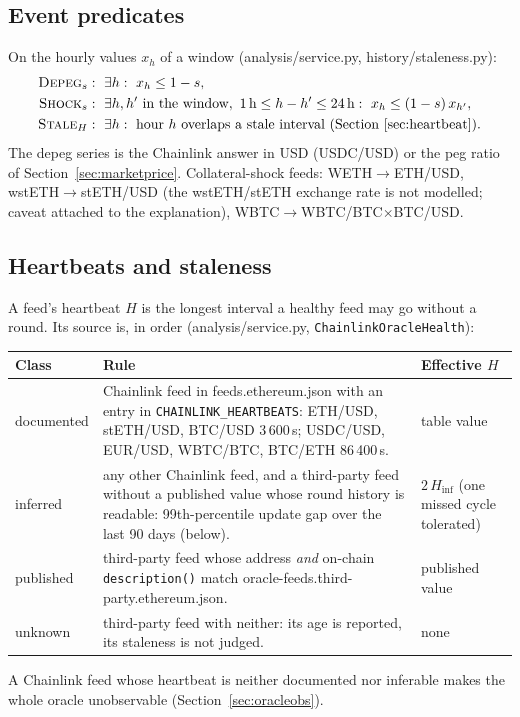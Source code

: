 \documentclass[11pt,a4paper]{article}
\newcommand{\code}[1]{\texttt{#1}}
\newcommand{\src}[1]{\textsf{\small #1}}
\begin{document}
\subsection{Event predicates}

On the hourly values $x_h$ of a window (\src{analysis/service.py},
\src{history/staleness.py}):
\begin{align}
\textsc{Depeg}_s &:\ \exists h:\ x_h\leq 1-s, \\
\textsc{Shock}_s &:\ \exists h,h'\ \text{in the window},\ 1\,\text{h}\leq h-h'\leq 24\,\text{h}:\ x_h\leq(1-s)\,x_{h'}, \\
\textsc{Stale}_H &:\ \exists h:\ \text{hour } h \text{ overlaps a stale interval (Section~\ref{sec:heartbeat})}.
\end{align}
The depeg series is the Chainlink answer in USD (USDC/USD) or the peg ratio of
Section~\ref{sec:marketprice}. Collateral-shock feeds: WETH$\to$ETH/USD,
wstETH$\to$stETH/USD (the wstETH/stETH exchange rate is not modelled; caveat
attached to the explanation), WBTC$\to$WBTC/BTC$\times$BTC/USD.

\subsection{Heartbeats and staleness}\label{sec:heartbeat}

A feed's heartbeat $H$ is the longest interval a healthy feed may go without a
round. Its source is, in order (\src{analysis/service.py},
\code{ChainlinkOracleHealth}):

\begin{center}\small
\begin{tabularx}{\textwidth}{@{}L{2.4cm}YL{3.2cm}@{}}
\toprule
Class & Rule & Effective $H$ \\
\midrule
documented & Chainlink feed in \src{feeds.ethereum.json} with an entry in \code{CHAINLINK\_HEARTBEATS}: ETH/USD, stETH/USD, BTC/USD 3\,600\,s; USDC/USD, EUR/USD, WBTC/BTC, BTC/ETH 86\,400\,s. & table value \\
inferred & any other Chainlink feed, and a third-party feed without a published value whose round history is readable: 99th-percentile update gap over the last 90 days (below). & $2\,H_{\text{inf}}$ (one missed cycle tolerated) \\
published & third-party feed whose address \emph{and} on-chain \code{description()} match \src{oracle-feeds.third-party.ethereum.json}. & published value \\
unknown & third-party feed with neither: its age is reported, its staleness is not judged. & none \\
\bottomrule
\end{tabularx}
\end{center}
A Chainlink feed whose heartbeat is neither documented nor inferable makes the
whole oracle unobservable (Section~\ref{sec:oracleobs}).
\end{document}
